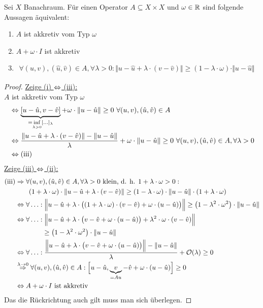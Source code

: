 \begin{lemma}
Sei $X$ Banachraum. Für einen Operator $A\subseteq X\times X$ und $\omega\in\mathbb{R}$ sind folgende Aussagen äquivalent:
\begin{enumerate}[label=(\roman*)]
\item $A$ ist akkretiv vom Typ $\omega$
\item $A+\omega\cdot I$ ist akkretiv
\item $\begin{aligned}\forall (u,v),(\hat{u},\hat{v})\in A,\forall\lambda>0:\Vert u-\hat{u}+\lambda\cdot(v-\hat{v})\Vert\geq(1-\lambda\cdot\omega)\cdot\Vert u-\hat{u}\Vert
\end{aligned}$
\end{enumerate}
\end{lemma}
\begin{proof}
\underline{Zeige (i) $\Leftrightarrow$ (iii):}\\
$A$ ist akkretiv vom Typ $\omega$
\begin{align*}
&\Leftrightarrow\underbrace{[u-\hat{u},v-\hat{v}]}_{=\inf\limits_{\lambda>0}[\ldots]_\lambda}
+ \omega\cdot\Vert u-\hat{u}\Vert\geq0~\forall(u,v),(\hat{u},\hat{v})\in A\\
&\Leftrightarrow\frac{\Vert u-\hat{u}+\lambda\cdot(v-\hat{v})\Vert-\Vert u-\hat{u}\Vert}{\lambda}+\omega\cdot\Vert u-\hat{u}\Vert\geq0~\forall(u,v),(\hat{u},\hat{v})\in A,\forall\lambda>0\\
&\Leftrightarrow\text{(iii)}
\end{align*}
\underline{Zeige (iii) $\Leftrightarrow$ (ii):}
\begin{align*}
\text{(iii)} &\Rightarrow\forall(u,v),(\hat{u},\hat{v})\in A,\forall\lambda>0\text{ klein, d. h. }1+\lambda\cdot\omega>0:\\
&\qquad(1+\lambda\cdot\omega)\cdot\Vert u-\hat{u}+\lambda\cdot(v-\hat{v})\Vert\geq(1-\lambda\cdot\omega)\cdot\Vert u-\hat{u}\Vert\cdot(1+\lambda\cdot\omega)\\
&\Leftrightarrow\forall\ldots:\Big\Vert u-\hat{u}+\lambda\cdot\big((1+\lambda\cdot\omega)\cdot (v-\hat{v})+\omega\cdot(u-\hat{u})\big)\Big\Vert
\geq
\left(1-\lambda^2\cdot\omega^2\right)\cdot\Vert u-\hat{u}\Vert\\
&\Leftrightarrow\forall\ldots:
\Big\Vert u-\hat{u}+\lambda\cdot\big(v-\hat{v}+\omega\cdot(u-\hat{u})\big)+\lambda^2\cdot\omega\cdot(v-\hat{v})\Big\Vert\\
&\qquad\qquad\geq
\left(1-\lambda^2\cdot\omega^2\right)\cdot\Vert u-\hat{u}\Vert\\
&\Leftrightarrow\forall\ldots:
\frac{\Big\Vert u-\hat{u}+\lambda\cdot\big(v-\hat{v}+\omega\cdot(u-\hat{u})\big)\Big\Vert-\Vert u-\hat{u}\Vert}{\lambda}+\mathcal{O}(\lambda)\geq0\\
&\stackrel{\lambda\to0}{\Rightarrow}
\forall(u,v),(\hat{u},\hat{v})\in A:\Big[ u-\hat{u},\underbrace{v}_{=Au}-\hat{v}+\omega\cdot(u-\hat{u})\Big]\geq0\\
&\Leftrightarrow A+\omega\cdot I\text{ ist akkretiv}
\end{align*}
Das die Rückrichtung auch gilt muss man sich überlegen.
\end{proof}

